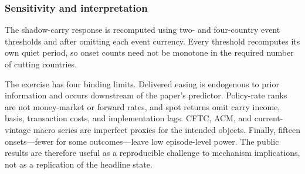 \subsubsection{Sensitivity and interpretation}

The shadow-carry response is recomputed using two- and four-country event thresholds and after omitting each event currency. Every threshold recomputes its own quiet period, so onset counts need not be monotone in the required number of cutting countries.



The exercise has four binding limits. Delivered easing is endogenous to prior information and occurs downstream of the paper's predictor. Policy-rate ranks are not money-market or forward rates, and spot returns omit carry income, basis, transaction costs, and implementation lags. CFTC, ACM, and current-vintage macro series are imperfect proxies for the intended objects. Finally, fifteen onsets---fewer for some outcomes---leave low episode-level power. The public results are therefore useful as a reproducible challenge to mechanism implications, not as a replication of the headline state.
